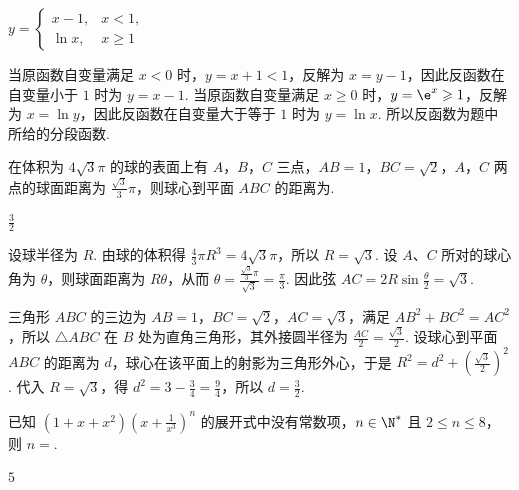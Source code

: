 \begin{answer}
\(y = \begin{cases}
x - 1, & x < 1,\\
\ln x, & x \geqslant 1
\end{cases}\)
\end{answer}

\begin{solution}
当原函数自变量满足 \(x<0\) 时，\(y=x+1<1\)，反解为 \(x=y-1\)，因此反函数在自变量小于 \(1\) 时为 \(y=x-1\). 当原函数自变量满足 \(x\geqslant0\) 时，\(y=\e^x\geqslant1\)，反解为 \(x=\ln y\)，因此反函数在自变量大于等于 \(1\) 时为 \(y=\ln x\). 所以反函数为题中所给的分段函数.
\end{solution}

\begin{problem}
在体积为 \(4\sqrt{3}\pi\) 的球的表面上有 \(A\)，\(B\)，\(C\) 三点，\(AB = 1\)，\(BC = \sqrt{2}\)，\(A\)，\(C\) 两点的球面距离为 \(\frac{\sqrt{3}}{3}\pi\)，则球心到平面 \(ABC\) 的距离为\fillinblank{}.
\end{problem}

\begin{answer}
\(\frac{3}{2}\)
\end{answer}

\begin{solution}
设球半径为 \(R\). 由球的体积得 \(\frac{4}{3}\pi R^3=4\sqrt{3}\pi\)，所以 \(R=\sqrt{3}\). 设 \(A\)、\(C\) 所对的球心角为 \(\theta\)，则球面距离为 \(R\theta\)，从而
\(\theta=\frac{\frac{\sqrt{3}}{3}\pi}{\sqrt{3}}=\frac{\pi}{3}\). 因此弦 \(AC=2R\sin\frac{\theta}{2}=\sqrt{3}\).

三角形 \(ABC\) 的三边为 \(AB=1\)，\(BC=\sqrt{2}\)，\(AC=\sqrt{3}\)，满足 \(AB^2+BC^2=AC^2\)，所以 \(\triangle ABC\) 在 \(B\) 处为直角三角形，其外接圆半径为 \(\frac{AC}{2}=\frac{\sqrt{3}}{2}\). 设球心到平面 \(ABC\) 的距离为 \(d\)，球心在该平面上的射影为三角形外心，于是
\(R^2=d^2+\left(\frac{\sqrt{3}}{2}\right)^2\). 代入 \(R=\sqrt{3}\)，得 \(d^2=3-\frac{3}{4}=\frac{9}{4}\)，所以 \(d=\frac{3}{2}\).
\end{solution}

\begin{problem}
已知 \((1 + x + x^{2})\left(x + \frac{1}{x^{3}}\right)^{n}\) 的展开式中没有常数项，\(n \in \N^{*}\) 且 \(2 \leqslant n \leqslant 8\)，则 \(n =\)\fillinblank{}.
\end{problem}

\begin{answer}
\(5\)
\end{answer}


